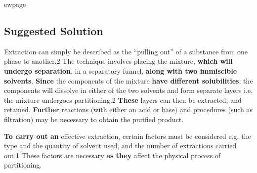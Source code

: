 \documentclass{article}
\begin{document}
ewpage
\subsection*{Suggested Solution}

Extraction can simply be described as the “pulling out” of a substance from one phase to another.2 The technique involves placing the mixture, \textbf{which will undergo separation}, in a separatory funnel, \textbf{along with two immiscible solvents}. \textbf{Since} the components of the mixture \textbf{have different solubilities}, the components will dissolve in either of the two solvents and form separate layers i.e. the mixture undergoes partitioning.2 \textbf{These} layers can then be extracted, and retained. \textbf{Further} reactions (with either an acid or base) and procedures (such as filtration) may be necessary to obtain the purified product.

\textbf{To carry out an} effective extraction, certain factors must be considered e.g. the type and the quantity of solvent used, and the number of extractions carried out.1 These factors are necessary \textbf{as they} affect the physical process of partitioning. 
\end{document}
